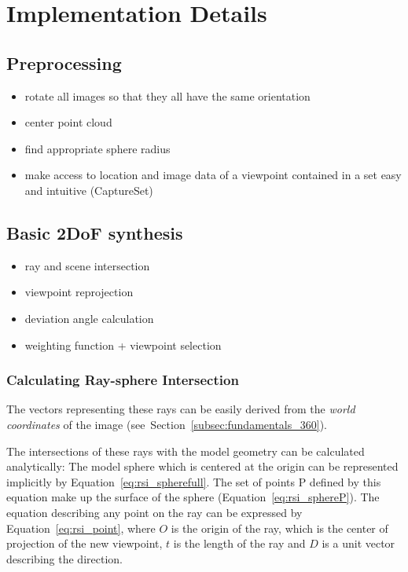 \section{Implementation Details} \label{sec:impl_details}

\subsection{Preprocessing}
\begin{itemize}
  \item rotate all images so that they all have the same orientation
  \item center point cloud
  \item find appropriate sphere radius
  \item make access to location and image data of a viewpoint contained in a set easy and intuitive (CaptureSet)
\end{itemize}

\subsection{Basic 2DoF synthesis}
\begin{itemize}
  \item ray and scene intersection
  \item viewpoint reprojection
  \item deviation angle calculation
  \item weighting function + viewpoint selection
\end{itemize}

\subsubsection{Calculating Ray-sphere Intersection}
The vectors representing these rays can be easily derived from the \emph{world coordinates} of the image (see~Section~\ref{subsec:fundamentals_360}).

The intersections of these rays with the model geometry can be calculated analytically: The model sphere which is centered at the origin can be represented implicitly by Equation~\ref{eq:rsi_spherefull}. The set of points P defined by this equation make up the surface of the sphere (Equation~\ref{eq:rsi_sphereP}). 
The equation describing any point on the ray can be expressed by Equation~\ref{eq:rsi_point}, where $O$ is the origin of the ray, which is the center of projection of the new viewpoint, $t$ is the length of the ray and $D$ is a unit vector describing the direction. 

